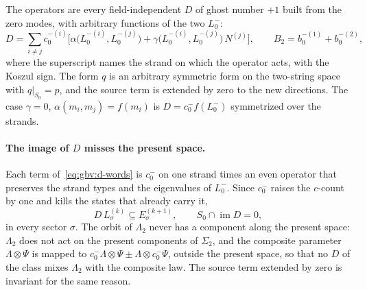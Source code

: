 The operators are every field-independent $D$ of ghost number $+1$ built from the zero modes, with arbitrary functions of the two $L_0^-$:
\begin{equation}
  \label{eq:gbv:d-words}
  D
    = \sum_{i \neq j} c_0^{-(i)} \Big[ \alpha\big( L_0^{-(i)}, L_0^{-(j)} \big) + \gamma\big( L_0^{-(i)}, L_0^{-(j)} \big) \, N^{(j)} \Big],
  \qquad
  B_2
    = b_0^{-(1)} + b_0^{-(2)},
\end{equation}
where the superscript names the strand on which the operator acts, with the Koszul sign.
The form $q$ is an arbitrary symmetric form on the two-string space with $q|_{S_0} = p$, and the source term is extended by zero to the new directions.
The case $\gamma = 0$, $\alpha(m_i, m_j) = f(m_i)$ is $D = c_0^- f(L_0^-)$ symmetrized over the strands.

\paragraph{The image of $D$ misses the present space.}
Each term of~\eqref{eq:gbv:d-words} is $c_0^-$ on one strand times an even operator that preserves the strand types and the eigenvalues of $L_0^-$.
Since $c_0^-$ raises the $c$-count by one and kills the states that already carry it,
\begin{equation}
  \label{eq:gbv:raise}
  D \, L^{(k)}_\sigma
    \subseteq E^{(k+1)}_\sigma,
  \qquad
  S_0 \cap \operatorname{im} D
    = 0,
\end{equation}
in every sector $\sigma$.
The orbit of $\Lambda_2$ never has a component along the present space: $\Lambda_2$ does not act on the present components of $\Sigma_2$, and the composite parameter $\Lambda \otimes \Psi$ is mapped to $c_0^- \Lambda \otimes \Psi \pm \Lambda \otimes c_0^- \Psi$, outside the present space, so that no $D$ of the class mixes $\Lambda_2$ with the composite law.
The source term extended by zero is invariant for the same reason.

